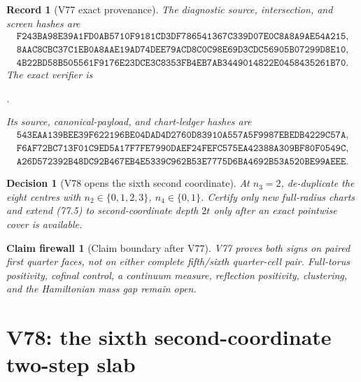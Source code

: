\documentclass[11pt,oneside]{article}
\newtheorem{firewall}[theorem]{Claim firewall}
\newtheorem{record}[theorem]{Record}
\newtheorem{decision}[theorem]{Decision}
\theoremstyle{definition}
\theoremstyle{remark}
\begin{document}
\begin{record}[V77 exact provenance]
\label{rec:newv77-provenance}
The diagnostic source, intersection, and screen hashes are
\[
\begin{gathered}
\texttt{F243BA98E39A1FD0AB5710F9181CD3DF786541367C339D07E0C8A8A9AE54A215},\\
\texttt{8AAC8CBC37C1EB0A8AAE19AD74DEE79ACD8C0C98E69D3CDC56905B07299D8E10},\\
\texttt{4B22BD58B505561F9176E23DCE3C8353FB4EB7AB3449014822E0458435261B70}.
\end{gathered}                                          \tag{77.8}
\]
The exact verifier is
\begin{center}\footnotesize
{}.
\end{center}
Its source, canonical-payload, and chart-ledger hashes are
\[
\begin{gathered}
\texttt{543EAA139BEE39F622196BE04DAD4D2760D83910A557A5F9987EBEDB4229C57A},\\
\texttt{F6AF72BC713F01C9ED5A17F7FE7990DAEF24FEFC575EA42388A309BF80F0549C},\\
\texttt{A26D572392B48DC92B467EB4E5339C962B53E7775D6BA4692B53A520BE99AEEE}.
\end{gathered}                                          \tag{77.9}
\]
\end{record}

\begin{decision}[V78 opens the sixth second coordinate]
\label{dec:newv77-next}
At \(n_3=2\), de-duplicate the eight centres with
\(n_2\in\{0,1,2,3\}\), \(n_4\in\{0,1\}\).  Certify only new
full-radius charts and extend (77.5) to second-coordinate depth
\(2t\) only after an exact pointwise cover is available.
\end{decision}

\begin{firewall}[Claim boundary after V77]
\label{fire:newv77-final}
V77 proves both signs on paired first quarter faces, not on either
complete fifth/sixth quarter-cell pair.  Full-torus positivity,
cofinal control, a continuum measure, reflection positivity,
clustering, and the Hamiltonian mass gap remain open.
\end{firewall}

\section{V78: the sixth second-coordinate two-step slab}
\label{sec:newv78-sixth-second-two-step}
\end{document}
